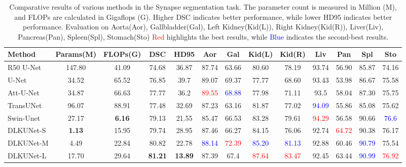 \documentclass[sn-mathphys-num]{sn-jnl}
\theoremstyle{thmstyleone}%
\theoremstyle{thmstyletwo}%
\theoremstyle{thmstylethree}%
\begin{document}
\begin{table}
    \centering
    \caption{Comparative results of various methods in the Synapse segmentation task.
    The parameter count is measured in Million (M), and FLOPs are calculated in Gigaflops (G).
    Higher DSC indicates better performance, while lower HD95 indicates better performance.
    Evaluation on Aorta(Aor), Gallbladder(Gal), Left Kidney(Kid(L)), Right Kidney(Kid(R)), Liver(Liv), Pancreas(Pan), Spleen(Spl), Stomach(Sto)
    \textcolor{red}{Red} highlights the best results, while \textcolor{blue}{Blue} indicates the second-best results.}
    \label{tab2}
    \begin{tabular*}{\textwidth}{@{\extracolsep{\fill}}lcccccccccccc}
        \toprule
        \textbf{Method} & \textbf{Params(M)} & \textbf{FLOPs(G)} & \textbf{DSC} & \textbf{HD95} & \textbf{Aor} & \textbf{Gal} & \textbf{Kid(L)} & \textbf{Kid(R)} & \textbf{Liv} & \textbf{Pan} & \textbf{Spl} & \textbf{Sto} \\
        \midrule
        R50 U-Net\cite{chen2021transunet} & 147.80 & 41.09 & 74.68 & 36.87 & 87.74 & 63.66 & 80.60 & 78.19 & 93.74 & 56.90 & 85.87 & 74.16 \\
        U-Net\cite{ronneberger2015u} & 34.52  & 65.52 & 76.85 & 39.7  & 89.07 & 69.37 & 77.77 & 68.60 & 93.43 & 53.98 & 86.67 & 75.58 \\
        Att-U-Net\cite{oktay2018attention} & 34.87 & 66.63 & 77.77 & 36.2 & \textcolor{red}{89.55} & \textcolor{blue}{68.88} & 77.98 & 71.11 & 93.5 & 58.04 & 87.30 & 75.75 \\
        TransUNet\cite{chen2021transunet}  & 96.07  & 88.91 & 77.48 & 32.69 & 87.23 & 63.16 & 81.87 & 77.02 & \textcolor{blue}{94.09} & 55.86 & 85.08 & 75.62 \\
        Swin-Unet\cite{cao2022swin}  & 27.17  & \textbf{6.16}  & 79.13 & 21.55 & 85.47 & 66.53 & 83.28 & 79.61 & \textcolor{red}{94.29} & 56.58 & 90.66 & \textcolor{blue}{76.6} \\
        \midrule
        DLKUNet-S & \textbf{1.13} & 15.95 & 79.74 & 28.95 & 87.46 & 66.27 & 84.15 & 76.06 & 92.74 & \textcolor{red}{64.72} & 90.38 & 76.17 \\
        DLKUNet-M & 4.49 & 22.84 & 80.82 & 22.78 & \textcolor{blue}{88.14} & \textcolor{red}{72.39} & \textcolor{blue}{85.20} & \textcolor{blue}{81.13} & 92.88 & 60.46 & \textcolor{blue}{90.79} & 75.54 \\
        DLKUNet-L & 17.70 & 29.64 & \textbf{81.21} & \textbf{13.89} & 87.39 & 67.4 & \textcolor{red}{87.64} & \textcolor{red}{83.47} & 92.45 & 63.44 & \textcolor{blue}{90.99} & \textcolor{red}{76.92} \\
        \bottomrule
    \end{tabular*}
\end{table}
\end{document}
